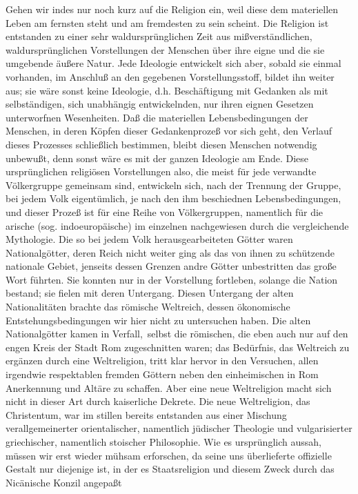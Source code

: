 Gehen wir indes nur noch kurz auf die Religion ein, weil diese
dem materiellen Leben am fernsten steht und am fremdesten zu sein
scheint. Die Religion ist entstanden zu einer sehr waldursprünglichen
Zeit aus mißverständlichen, waldursprünglichen Vorstellungen der
Menschen über ihre eigne und die sie umgebende äußere Natur. Jede
Ideologie entwickelt sich aber, sobald sie einmal vorhanden, im Anschluß
an den gegebenen Vorstellungsstoff, bildet ihn weiter aus; sie wäre
sonst keine Ideologie, d.h. Beschäftigung mit Gedanken als mit
selbständigen, sich unabhängig entwickelnden, nur ihren eignen Gesetzen
unterworfnen Wesenheiten. Daß die materiellen Lebensbedingungen der
Menschen, in deren Köpfen dieser Gedankenprozeß vor sich geht, den
Verlauf dieses Prozesses schließlich bestimmen, bleibt diesen Menschen
notwendig unbewußt, denn sonst wäre es mit der ganzen Ideologie am Ende.
Diese ursprünglichen religiösen Vorstellungen also, die meist für jede
verwandte Völkergruppe gemeinsam sind, entwickeln sich, nach der
Trennung der Gruppe, bei jedem Volk eigentümlich, je nach den ihm
beschiednen Lebensbedingungen, und dieser Prozeß ist für eine Reihe von
Völkergruppen, namentlich für die arische (sog. indoeuropäische) im
einzelnen nachgewiesen durch die vergleichende Mythologie. Die so bei
jedem Volk herausgearbeiteten Götter waren Nationalgötter, deren Reich
nicht weiter ging als das von ihnen zu schützende nationale Gebiet,
jenseits dessen Grenzen andre Götter unbestritten das große Wort
führten. Sie konnten nur in der Vorstellung fortleben, solange die
Nation bestand; sie fielen mit deren Untergang. Diesen Untergang der
alten Nationalitäten brachte das römische Weltreich, dessen ökonomische
Entstehungsbedingungen wir hier nicht zu untersuchen haben. Die alten
Nationalgötter kamen in Verfall,\est\ selbst die römischen, die eben auch nur
auf den engen Kreis der Stadt Rom zugeschnitten waren; das Bedürfnis,
das Weltreich zu ergänzen durch eine Weltreligion, tritt klar hervor in
den Versuchen, allen irgendwie respektablen fremden Göttern neben den
einheimischen in Rom Anerkennung und Altäre zu schaffen. Aber eine neue
Weltreligion macht sich nicht in dieser Art durch kaiserliche Dekrete.
Die neue Weltreligion, das Christentum, war im stillen bereits
entstanden aus einer Mischung verallgemeinerter orientalischer,
namentlich jüdischer Theologie
und vulgarisierter griechischer, namentlich stoischer Philosophie. Wie
es ursprünglich aussah, müssen wir erst wieder mühsam erforschen, da
seine uns überlieferte offizielle Gestalt nur diejenige ist, in der es
Staatsreligion und diesem Zweck durch das Nicänische Konzil angepaßt
